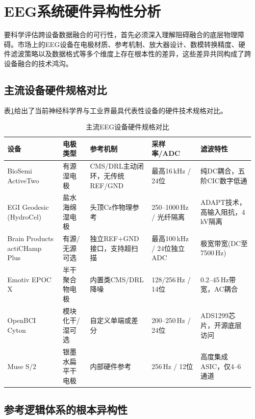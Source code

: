 \documentclass[12pt, a4paper]{article}
\begin{document}
\section{EEG系统硬件异构性分析}
\label{sec:hardware}

要科学评估跨设备数据融合的可行性，首先必须深入理解阻碍融合的底层物理障碍。市场上的EEG设备在电极材质、参考机制、放大器设计、数模转换精度、硬件滤波策略以及数据格式等多个维度上存在根本性的差异，这些差异共同构成了跨设备融合的技术鸿沟。

\subsection{主流设备硬件规格对比}

表\ref{tab:devices}给出了当前神经科学界与工业界最具代表性设备的硬件技术规格对比。

\begin{table}[H]
\centering
\caption{主流EEG设备硬件规格对比}
\label{tab:devices}
\small
\begin{tabularx}{\textwidth}{p{3cm}XXXX}
\toprule
\textbf{设备} & \textbf{电极类型} & \textbf{参考机制} & \textbf{采样率/ADC} & \textbf{滤波特性} \\
\midrule
BioSemi ActiveTwo & 有源湿电极 & CMS/DRL主动闭环，无传统REF/GND & 最高16\,kHz / 24位 & 纯DC耦合，五阶CIC数字低通 \\
\addlinespace
EGI Geodesic (HydroCel) & 盐水海绵湿电极 & 头顶Cz作物理参考 & 250--1000\,Hz / 光纤隔离 & ADAPT技术，高输入阻抗，4\,kV隔离 \\
\addlinespace
Brain Products actiCHamp Plus & 有源/无源可选 & 独立REF+GND接口，支持超扫描 & 最高100\,kHz / 24位独立ADC & 极宽带宽(DC至7500\,Hz) \\
\addlinespace
Emotiv EPOC X & 半干聚合物电极 & 内置类CMS/DRL降噪 & 128/256\,Hz / 14位 & 0.2--45\,Hz带宽，AC耦合 \\
\addlinespace
OpenBCI Cyton & 模块化干/湿可选 & 自定义单端或差分 & 200--250\,Hz / 24位 & ADS1299芯片，开源底层访问 \\
\addlinespace
Muse S/2 & 银墨水扁平干电极 & 内部硬件参考 & 256\,Hz / 12位 & 高度集成ASIC，仅4--6通道 \\
\bottomrule
\end{tabularx}
\end{table}

\subsection{参考逻辑体系的根本异构性}
\end{document}
